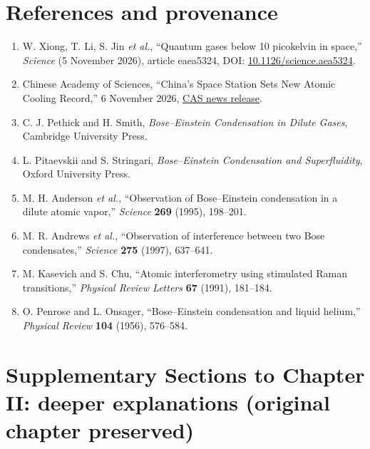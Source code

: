 \documentclass[11pt,a4paper]{article}
\begin{document}
\section{References and provenance}
\begin{enumerate}[leftmargin=*,itemsep=3pt]
\item W. Xiong, T. Li, S. Jin \emph{et al.}, ``Quantum gases below 10 picokelvin in space,'' \emph{Science} (5 November 2026), article eaea5324, DOI: \href{https://doi.org/10.1126/science.aea5324}{10.1126/science.aea5324}.
\item Chinese Academy of Sciences, ``China's Space Station Sets New Atomic Cooling Record,'' 6 November 2026, \href{https://english.cas.cn/newsroom/cas-in-media/202611/t20261106_1213502.shtml}{CAS news release}.
\item C. J. Pethick and H. Smith, \emph{Bose--Einstein Condensation in Dilute Gases}, Cambridge University Press.
\item L. Pitaevskii and S. Stringari, \emph{Bose--Einstein Condensation and Superfluidity}, Oxford University Press.
\item M. H. Anderson \emph{et al.}, ``Observation of Bose--Einstein condensation in a dilute atomic vapor,'' \emph{Science} \textbf{269} (1995), 198--201.
\item M. R. Andrews \emph{et al.}, ``Observation of interference between two Bose condensates,'' \emph{Science} \textbf{275} (1997), 637--641.
\item M. Kasevich and S. Chu, ``Atomic interferometry using stimulated Raman transitions,'' \emph{Physical Review Letters} \textbf{67} (1991), 181--184.
\item O. Penrose and L. Onsager, ``Bose--Einstein condensation and liquid helium,'' \emph{Physical Review} \textbf{104} (1956), 576--584.
\end{enumerate}

\clearpage
\section*{Supplementary Sections to Chapter II: deeper explanations (original chapter preserved)}
\end{document}
